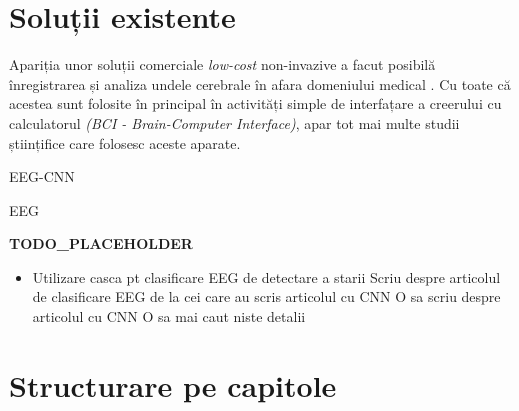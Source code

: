\section{Soluții existente}
Apariția unor soluții comerciale \textit{low-cost} non-invazive a facut posibilă înregistrarea și analiza undele cerebrale în afara domeniului medical \cite{online:emotiv}. Cu toate că acestea sunt folosite în principal în activități simple de interfațare a creerului cu calculatorul \textit{(BCI - Brain-Computer Interface)}, apar tot mai multe studii științifice care folosesc aceste aparate.

EEG-CNN\cite{EEG-CNN:2020}



EEG\cite{EEG:2018}

\textbf{TODO\_PLACEHOLDER}
\begin{itemize}
	\item Utilizare casca pt clasificare EEG de detectare a starii
	\subitem Scriu despre articolul de clasificare EEG de la cei care au scris articolul cu CNN
	\subitem O sa scriu despre articolul cu CNN
	\subitem O sa mai caut niste detalii
\end{itemize}
\section{Structurare pe capitole}